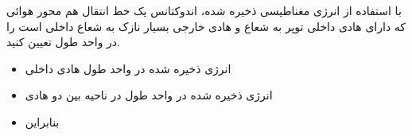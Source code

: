 \begin{ELexample}{}

با استفاده از انرژی مغناطیسی ذخیره شده، اندوکتانس یک خط انتقال هم محور هوائی که دارای هادی داخلی توپر به شعاع  و هادی خارجی بسیار نازک به شعاع داخلی  است را در واحد طول تعیین کنید.

\begin{ELsolution}

\begin{itemize}
\tightlist
\item
  انرژی ذخیره شده در واحد طول هادی داخلی
\end{itemize}


\begin{itemize}
\tightlist
\item
  انرژی ذخیره شده در واحد طول در ناحیه بین دو هادی
\end{itemize}


\begin{itemize}
\tightlist
\item
  بنابراین
\end{itemize}


\end{ELsolution}

\end{ELexample}


